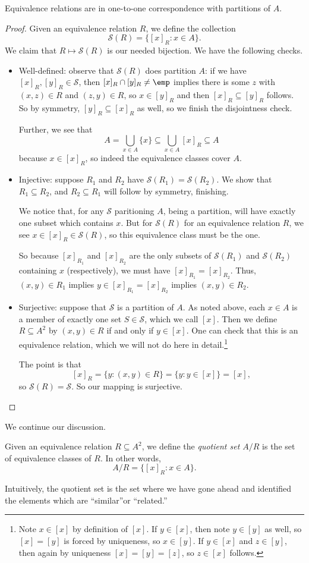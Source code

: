 \begin{lemma}
	Equivalence relations are in one-to-one correspondence with partitions of $A$.
\end{lemma}
\begin{proof}
	Given an equivalence relation $R$, we define the collection
	\[\mathcal S(R)=\{[x]_R:x\in A\}.\]
	We claim that $R\mapsto\mathcal S(R)$ is our needed bijection. We have the following checks.
	\begin{itemize}
		\item Well-defined: observe that $\mathcal S(R)$ does partition $A$: if we have $[x]_R,[y]_R\in\mathcal S$, then $[x]_R\cap[y]_R\ne\emp$ implies there is some $z$ with $(x,z)\in R$ and $(z,y)\in R$, so $x\in[y]_R$ and then $[x]_R\subseteq[y]_R$ follows. So by symmetry, $[y]_R\subseteq[x]_R$ as well, so we finish the disjointness check.
	
		Further, we see that
		\[A=\bigcup_{x\in A}\{x\}\subseteq\bigcup_{x\in A}[x]_R\subseteq A\]
		because $x\in[x]_R$, so indeed the equivalence classes cover $A$.

		\item Injective: suppose $R_1$ and $R_2$ have $\mathcal S(R_1)=\mathcal S(R_2)$. We show that $R_1\subseteq R_2$, and $R_2\subseteq R_1$ will follow by symmetry, finishing.
		
		We notice that, for any $\mathcal S$ paritioning $A$, being a partition, will have exactly one subset which contains $x$. But for $\mathcal S(R)$ for an equivalence relation $R$, we see $x\in[x]_R\in\mathcal S(R)$, so this equivalence class must be the one.

		So because $[x]_{R_1}$ and $[x]_{R_2}$ are the only subsets of $\mathcal S(R_1)$ and $\mathcal S(R_2)$ containing $x$ (respectively), we must have $[x]_{R_1}=[x]_{R_2}$. Thus, $(x,y)\in R_1$ implies $y\in[x]_{R_1}=[x]_{R_2}$ implies $(x,y)\in R_2$.

		\item Surjective: suppose that $\mathcal S$ is a partition of $A$. As noted above, each $x\in A$ is a member of exactly one set $S\in\mathcal S$, which we call $[x]$. Then we define $R\subseteq A^2$ by $(x,y)\in R$ if and only if $y\in[x]$. One can check that this is an equivalence relation, which we will not do here in detail.\footnote{Note $x\in[x]$ by definition of $[x]$. If $y\in[x]$, then note $y\in[y]$ as well, so $[x]=[y]$ is forced by uniqueness, so $x\in[y]$. If $y\in[x]$ and $z\in[y]$, then again by uniqueness $[x]=[y]=[z]$, so $z\in[x]$ follows.}

		The point is that
		\[[x]_R=\{y:(x,y)\in R\}=\{y:y\in[x]\}=[x],\]
		so $\mathcal S(R)=\mathcal S$. So our mapping is surjective.
		\qedhere
	\end{itemize}
\end{proof}
We continue our discussion.
\begin{definition}
	Given an equivalence relation $R\subseteq A^2$, we define the \textit{quotient set $A/R$} is the set of equivalence classes of $R$. In other words,
	\[A/R=\{[x]_R:x\in A\}.\]
\end{definition}
Intuitively, the quotient set is the set where we have gone ahead and identified the elements which are ``similar''or ``related.''

